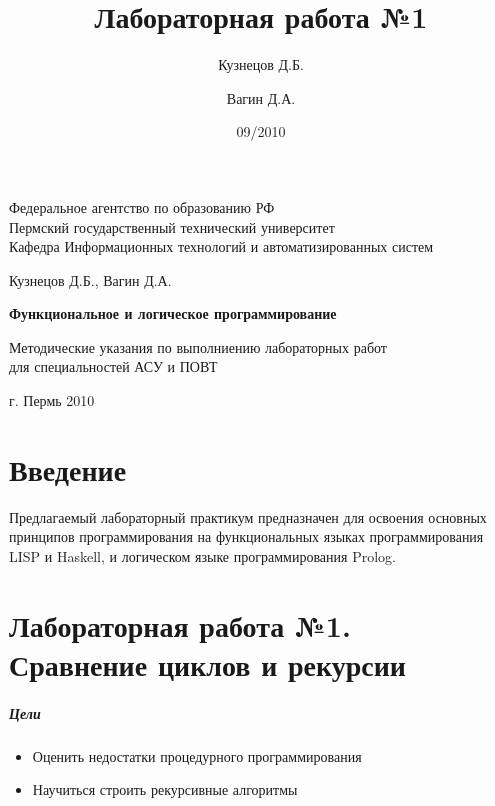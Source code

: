 \documentclass[a4paper,12pt]{article}
\title{Лабораторная работа №1}
\author{Кузнецов Д.Б.\and Вагин Д.А.}
\date{09/2010}
\begin{document}
\begin{titlepage}
\newpage

\begin{center}
Федеральное агентство по образованию РФ\\
Пермский государственный технический университет\\
Кафедра Информационных технологий и автоматизированных систем
\end{center}

\vspace{8em}

\begin{center}
\Large Кузнецов Д.Б., Вагин Д.А.
\end{center}

\vspace{2em}

\begin{center}
\Huge \textbf{Функциональное и логическое программирование}
\end{center}
\begin{center}
Методические указания по выполниению лабораторных работ\\
для специальностей АСУ и ПОВТ
\end{center}



\vspace{\fill}

\begin{center}
г. Пермь 2010
\end{center}

\end{titlepage}

\newpage
\section{Введение}
Предлагаемый лабораторный практикум предназначен для освоения 
основных принципов программирования на функциональных языках программирования 
LISP и Haskell, и логическом языке программирования Prolog.




\newpage
\section{Лабораторная работа №1.\\Сравнение циклов и рекурсии}
\paragraph{}
\subparagraph{Цели}
\begin{itemize}
	\item Оценить недостатки процедурного программирования
	\item Научиться строить рекурсивные алгоритмы
\end{itemize}
\end{document}
